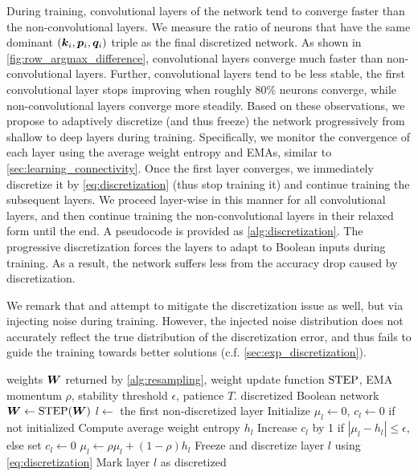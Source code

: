 During training, convolutional layers of the network tend to converge faster than the non-convolutional layers. We measure the ratio of neurons that have the same dominant $({\bm{k}}_i, {\bm{p}}_i, {\bm{q}}_i)$ triple as the final discretized network. As shown in \cref{fig:row_argmax_difference}, convolutional layers converge much faster than non-convolutional layers. Further, convolutional layers tend to be less stable, \eg the first convolutional layer stops improving when roughly 80\% neurons converge, while non-convolutional layers converge more steadily.
Based on these observations, 
we propose to adaptively discretize (and thus freeze) the network progressively from shallow to deep layers during training.
 Specifically, we monitor the convergence of each layer using the average weight entropy and EMAs, similar to \cref{sec:learning_connectivity}.
Once the first layer converges, we immediately discretize it by \cref{eq:discretization}  (thus stop training it) and continue training the
subsequent layers. We proceed layer-wise in this manner for all convolutional layers, and then continue training the
non-convolutional layers in their relaxed form until the end. A pseudocode is provided as \cref{alg:discretization}.
The progressive discretization  forces the layers to adapt to Boolean inputs during training. As a result,   the network suffers less from the accuracy drop caused by discretization.



We remark that
 \citet{kim2023deep} and \citet{yousefi2025mind} attempt to
 mitigate the discretization issue as well, but via injecting noise during training.
However, the injected noise distribution does not accurately reflect the true distribution of the discretization error, and thus fails to guide the training towards better solutions (c.f. \cref{sec:exp_discretization}).



\begin{algorithm}[tb]
  \caption{Adaptive Discretization}
  \label{alg:discretization}
  \begin{algorithmic}
     weights ${\bm{W}}$ returned by \cref{alg:resampling}, weight update function $\operatorname{STEP}$, EMA momentum $\rho$, stability threshold $\epsilon$, patience $T$.
     discretized Boolean network
    \REPEAT
      \STATE ${\bm{W}} \gets \operatorname{STEP}({\bm{W}})$
      \STATE $l \gets$ the first non-discretized layer
      \STATE Initialize $\mu_l \gets 0$, $c_l \gets 0$ if not initialized
      \STATE Compute average weight entropy $h_l$
      \STATE Increase $c_l$ by 1 if $|\mu_l - h_l| \le \epsilon$, else set $c_l \gets 0$
      \STATE $\mu_l \gets \rho \mu_l + (1-\rho) h_l$
        \STATE Freeze and discretize layer $l$ using \cref{eq:discretization}
        \STATE Mark layer $l$ as discretized
      \ENDIF
  \end{algorithmic}
\end{algorithm}
